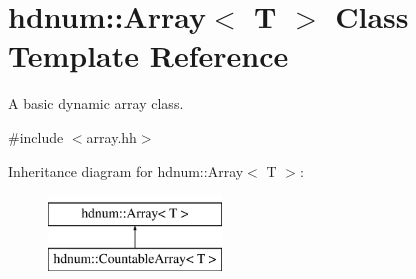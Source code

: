 \hypertarget{classhdnum_1_1Array}{
\section{hdnum::Array$<$ T $>$ Class Template Reference}
\label{classhdnum_1_1Array}
}


A basic dynamic array class.  




{\ttfamily \#include $<$array.hh$>$}

Inheritance diagram for hdnum::Array$<$ T $>$:\begin{figure}[H]
\begin{center}
\leavevmode
\includegraphics[height=2cm]{classhdnum_1_1Array}
\end{center}
\end{figure}
